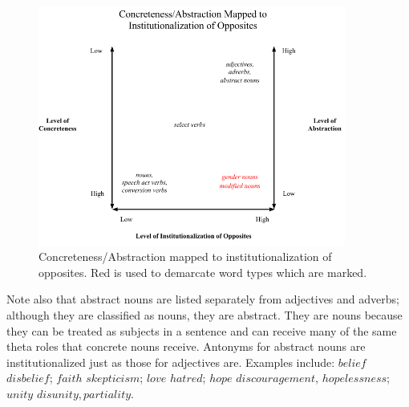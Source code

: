 \begin{figure}[here]
	\centering
	\includegraphics[width=0.9\textwidth]{images/Diagram.png}
	\caption{Concreteness/Abstraction mapped to institutionalization of opposites.  Red is used to demarcate word types which are marked.}
	\label{fig:introFig}
\end{figure}
	
Note also that abstract nouns are listed separately from adjectives and adverbs; although they are classified as nouns, they are abstract.  They are nouns because they can be treated as subjects in a sentence and can receive many of the same theta roles that concrete nouns receive.  
Antonyms for abstract nouns are institutionalized just as those for adjectives are.  Examples include: $belief$ \opp $disbelief$; $faith$ \opp $skepticism$; $love$ \opp $hatred$; $hope$ \opp $discouragement$, $hopelessness$; $unity$ \opp $disunity, partiality$.


